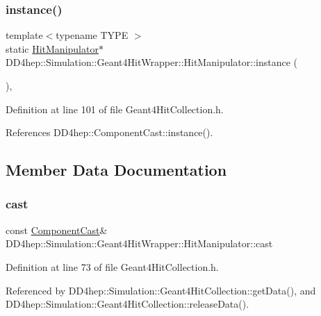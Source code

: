 \subsubsection{\texorpdfstring{instance()}{instance()}}
{\footnotesize\ttfamily template$<$typename T\+Y\+PE $>$ \\
static \hyperlink{class_d_d4hep_1_1_simulation_1_1_geant4_hit_wrapper_1_1_hit_manipulator}{Hit\+Manipulator}$\ast$ D\+D4hep\+::\+Simulation\+::\+Geant4\+Hit\+Wrapper\+::\+Hit\+Manipulator\+::instance (\begin{DoxyParamCaption}{ }\end{DoxyParamCaption})\hspace{0.3cm}{\ttfamily [inline]}, {\ttfamily [static]}}



Definition at line 101 of file Geant4\+Hit\+Collection.\+h.



References D\+D4hep\+::\+Component\+Cast\+::instance().



\subsection{Member Data Documentation}
\hypertarget{class_d_d4hep_1_1_simulation_1_1_geant4_hit_wrapper_1_1_hit_manipulator_a81d93c2f45fdb16c6b590401236f1ed5}{}\label{class_d_d4hep_1_1_simulation_1_1_geant4_hit_wrapper_1_1_hit_manipulator_a81d93c2f45fdb16c6b590401236f1ed5} 
\subsubsection{\texorpdfstring{cast}{cast}}
{\footnotesize\ttfamily const \hyperlink{class_d_d4hep_1_1_component_cast}{Component\+Cast}\& D\+D4hep\+::\+Simulation\+::\+Geant4\+Hit\+Wrapper\+::\+Hit\+Manipulator\+::cast}



Definition at line 73 of file Geant4\+Hit\+Collection.\+h.



Referenced by D\+D4hep\+::\+Simulation\+::\+Geant4\+Hit\+Collection\+::get\+Data(), and D\+D4hep\+::\+Simulation\+::\+Geant4\+Hit\+Collection\+::release\+Data().

